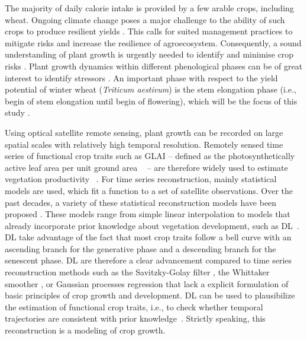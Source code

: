 The majority of daily calorie intake is provided by a few arable crops, including wheat. Ongoing climate change poses a major challenge to the ability of such crops to produce resilient yields \citep{asseng_rising_2015}. This calls for suited management practices to mitigate risks and increase the resilience of agroecosystem. Consequently, a sound understanding of plant growth is urgently needed to identify and minimise crop risks \citep{tilman_global_2011}. Plant growth dynamics within different phenological phases can be of great interest to identify stressors \citep{reynolds_physiological_2016}. An important phase with respect to the yield potential of winter wheat (\textsl{Triticum aestivum}) is the stem elongation phase (i.e., begin of stem elongation until begin of flowering), which will be the focus of this study \citep{kronenberg_monitoring_2017, miralles_duration_2000}.

Using optical satellite remote sensing, plant growth can be recorded on large spatial scales with relatively high temporal resolution. Remotely sensed time series of functional crop traits such as \gls{GLAI} -- defined as the photosynthetically active leaf area per unit ground area ~\citep{maddonni_leaf_1996} -- are therefore widely used to estimate vegetation productivity ~\citep{kooistra_reviews_2023}. For time series reconstruction, mainly statistical models are used, which fit a function to a set of satellite observations. Over the past decades, a variety of these statistical reconstruction models have been proposed  \citep{zeng_review_2020, kooistra_reviews_2023}. These models range from simple linear interpolation to models that already incorporate prior knowledge about vegetation development, such as \gls{DL}~\citep{beck_improved_2006}. \gls{DL} take advantage of the fact that most crop traits follow a bell curve with an ascending branch for the generative phase and a descending branch for the senescent phase. \gls{DL} are therefore a clear advancement compared to time series reconstruction methods such as the Savitzky-Golay filter \citep{savitzky_smoothing_1964}, the Whittaker smoother \citep{eilers_perfect_2003}, or Gaussian processes regression \citep{belda_optimizing_2020, pipia_green_2021} that lack a explicit formulation of basic principles of crop growth and development. \gls{DL} can be used to plausibilize the estimation of functional crop traits, i.e., to check whether temporal trajectories are consistent with prior knowledge~\citep{koetz_use_2005}. Strictly speaking, this reconstruction is a modeling of crop growth.

